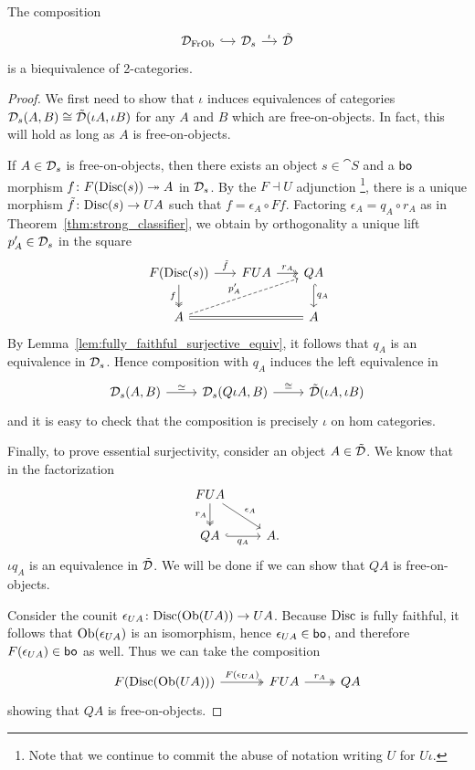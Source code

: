 \documentclass[11pt,oneside,article]{memoir}
\begin{document}
\begin{theorem}
      \label{thm:free_on_objects_strong_equivalence}
   The composition
   \[ \begin{tikzcd}[column sep=small]
      \ccatFrOb{D} \ar[r,hook]
         & \scat{D} \ar[r,"\iota"]
         & \pcat{D}
   \end{tikzcd} \]
   is a biequivalence of 2-categories.
\end{theorem}
\begin{proof}
   We first need to show that $\iota$ induces equivalences of categories
   $\mathcal{D}_s(A,B)\cong\tilde{\mathcal{D}}(\iota A,\iota B)$ for any $A$ and $B$ which are free-on-objects. In
   fact, this will hold as long as $A$ is free-on-objects.

   If $A\in\mathcal{D}_s$ is free-on-objects, then there exists an object $s\in\cat{S}$ and a $\mathsf{bo}$
   morphism $f\colon F(\mathrm{Disc}(s))\twoheadrightarrow A$ in $\mathcal{D}_s$. By the $F\dashv U$ adjunction%
   \footnote{Note that we continue to commit the abuse of notation writing $U$ for $U\iota$.},
   there is a unique morphism $\tilde{f}\colon\mathrm{Disc}(s)\to UA$ such that $f=\epsilon_A\circ Ff$.
   Factoring $\epsilon_A=q_A\circ r_A$ as in Theorem~\ref{thm:strong_classifier}, we obtain by
   orthogonality a unique lift $p'_A\in\mathcal{D}_s$ in the square
   \[ \begin{tikzcd}[column sep=1.7em]
      F(\Disc(s)) \ar[d,two heads,"f"'] \ar[r,"\tilde{f}"]
         & FUA \ar[r,two heads,"r_A"]
         & QA \ar[d,hook,"q_A"] \\
      A \ar[urr,dashed,"p'_A"] \ar[rr,equal] && A
   \end{tikzcd} \]
   By Lemma~\ref{lem:fully_faithful_surjective_equiv}, it follows that $q_A$ is an equivalence in
   $\mathcal{D}_s$. Hence composition with $q_A$ induces the left equivalence in
   \[ \begin{tikzcd}
      \scat{D}(A,B) \ar[r,"\equiv"]
         & \scat{D}(Q\iota A,B) \ar[r,"\iso"]
         & \pcat{D}(\iota A,\iota B)
   \end{tikzcd} \]
   and it is easy to check that the composition is precisely $\iota$ on hom categories.

   Finally, to prove essential surjectivity, consider an object $A\in\tilde{\mathcal{D}}$. We know that in the
   factorization
   \[ \begin{tikzcd}
      FUA \ar[dr,"\epsilon_A"] \ar[d,two heads,"r_A"'] & \\
      QA \ar[r,hook,"q_A"'] & A.
   \end{tikzcd} \]
   $\iota q_A$ is an equivalence in $\tilde{\mathcal{D}}$. We will be done if we can show that $QA$ is
   free-on-objects.

   Consider the counit $\epsilon_{UA}\colon\mathrm{Disc}(\mathrm{Ob}(UA))\to UA$. Because $\mathrm{Disc}$ is fully faithful,
   it follows that $\mathrm{Ob}(\epsilon_{UA})$ is an isomorphism, hence $\epsilon_{UA}\in\mathsf{bo}$, and
   therefore $F(\epsilon_{UA})\in\mathsf{bo}$ as well. Thus we can take the composition
   \[ \begin{tikzcd}
      F(\Disc(\Ob(UA))) \ar[r,two heads,"F(\epsilon_{UA})"]
         &[1em] FUA \ar[r,two heads,"r_A"]
         & QA
   \end{tikzcd} \]
   showing that $QA$ is free-on-objects.
\end{proof}
\end{document}
